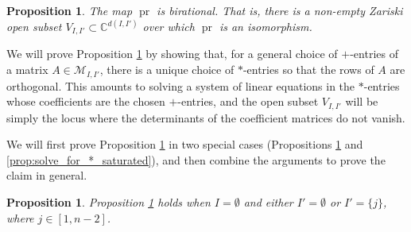 \documentclass[12pt]{amsart}
\newtheorem{proposition}[definition]{Proposition}
\DeclareMathOperator{\pr}{pr}
\newcommand{\bC}{\mathbb{C}}
\newcommand{\cM}{\mathcal{M}}
\begin{document}
\begin{proposition}\label{prop:solve_for_*}
The map $\pr$ is birational. That is, there is a non-empty Zariski open subset $V_{I,I'}\subset \bC^{d(I,I')}$ over which $\pr$ is an isomorphism.
\end{proposition}

We will prove Proposition \ref{prop:solve_for_*} by showing that, for a general choice of $+$-entries of a matrix $A\in\cM_{I,I'}$, there is a unique choice of $*$-entries so that the rows of $A$ are orthogonal. This amounts to solving a system of linear equations in the $*$-entries whose coefficients are the chosen $+$-entries, and the open subset $V_{I,I'}$ will be simply the locus where the determinants of the coefficient matrices do not vanish.

We will first prove Proposition \ref{prop:solve_for_*} in two special cases (Propositions \ref{prop:solve_for_*_box} and \ref{prop:solve_for_*_saturated}), and then combine the arguments to prove the claim in general.

\begin{proposition}\label{prop:solve_for_*_box}
    Proposition \ref{prop:solve_for_*} holds when $I=\emptyset$ and either $I'=\emptyset$ or $I'=\{j\}$, where $j\in[1,n-2]$. 
\end{proposition}
\end{document}

